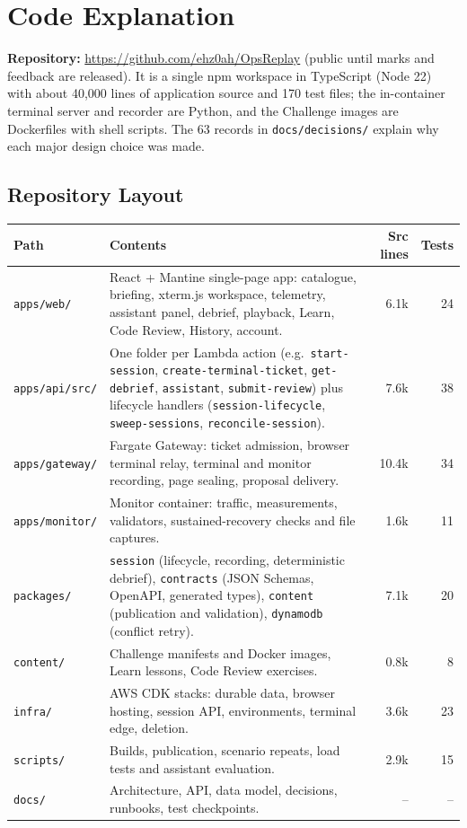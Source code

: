 \documentclass[11pt,a4paper]{article}
\newcommand{\Repo}{\url{https://github.com/ehz0ah/OpsReplay}}
\begin{document}
\section{Code Explanation}
\textbf{Repository:} \Repo{} (public until marks and feedback are released).
It is a single npm workspace in TypeScript (Node 22) with about 40,000 lines of
application source and 170 test files; the in-container terminal server and
recorder are Python, and the Challenge images are Dockerfiles with shell scripts.
The 63 records in \nolinkurl{docs/decisions/} explain why each major design choice was made.

\subsection{Repository Layout}
\begin{center}\footnotesize
\begin{tabularx}{\linewidth}{@{}>{\raggedright\arraybackslash}p{30mm}Yrr@{}}
\toprule
\textbf{Path} & \textbf{Contents} & \textbf{Src lines} & \textbf{Tests}\\
\midrule
\nolinkurl{apps/web/} & React + Mantine single-page app: catalogue, briefing,
xterm.js workspace, telemetry, assistant panel, debrief, playback, Learn, Code
Review, History, account. & 6.1k & 24\\
\nolinkurl{apps/api/src/} & One folder per Lambda action (e.g.\ \nolinkurl{start-session},
\nolinkurl{create-terminal-ticket}, \nolinkurl{get-debrief}, \nolinkurl{assistant},
\nolinkurl{submit-review}) plus lifecycle handlers (\nolinkurl{session-lifecycle},
\nolinkurl{sweep-sessions}, \nolinkurl{reconcile-session}). & 7.6k & 38\\
\nolinkurl{apps/gateway/} & Fargate Gateway: ticket admission, browser terminal relay,
terminal and monitor recording, page sealing, proposal delivery. & 10.4k & 34\\
\nolinkurl{apps/monitor/} & Monitor container: traffic, measurements, validators,
sustained-recovery checks and file captures. & 1.6k & 11\\
\nolinkurl{packages/} & \nolinkurl{session} (lifecycle, recording, deterministic debrief),
\nolinkurl{contracts} (JSON Schemas, OpenAPI, generated types), \nolinkurl{content}
(publication and validation), \nolinkurl{dynamodb} (conflict retry). & 7.1k & 20\\
\nolinkurl{content/} & Challenge manifests and Docker images, Learn lessons, Code Review
exercises. & 0.8k & 8\\
\nolinkurl{infra/} & AWS CDK stacks: durable data, browser hosting, session API,
environments, terminal edge, deletion. & 3.6k & 23\\
\nolinkurl{scripts/} & Builds, publication, scenario repeats, load tests and
assistant evaluation. & 2.9k & 15\\
\nolinkurl{docs/} & Architecture, API, data model, decisions, runbooks, test checkpoints. & -- & --\\
\bottomrule
\end{tabularx}
\end{center}
\end{document}
